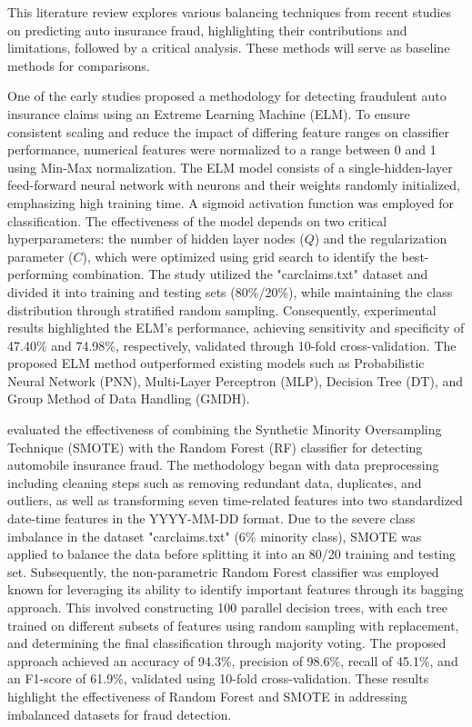 \documentclass[twoside,11pt]{article}
\begin{document}
\begin{keywords}
This literature review explores various balancing techniques from recent studies on predicting auto insurance fraud, highlighting their contributions and limitations, followed by a critical analysis. These methods will serve as baseline methods for comparisons.

One of the early studies \cite{Patel2019} proposed a methodology for detecting fraudulent auto insurance claims using an Extreme Learning Machine (ELM). To ensure consistent scaling and reduce the impact of differing feature ranges on classifier performance, numerical features were normalized to a range between 0 and 1 using Min-Max normalization. The ELM model consists of a single-hidden-layer feed-forward neural network with neurons and their weights randomly initialized, emphasizing high training time. A sigmoid activation function was employed for classification. The effectiveness of the model depends on two critical hyperparameters: the number of hidden layer nodes (\(Q\)) and the regularization parameter (\(C\)), which were optimized using grid search to identify the best-performing combination. The study utilized the "carclaims.txt" dataset and divided it into training and testing sets (80\%/20\%), while maintaining the class distribution through stratified random sampling. Consequently, experimental results highlighted the ELM's performance, achieving sensitivity and specificity of 47.40\% and 74.98\%, respectively, validated through 10-fold cross-validation. The proposed ELM method outperformed existing models such as Probabilistic Neural Network (PNN), Multi-Layer Perceptron (MLP), Decision Tree (DT), and Group Method of Data Handling (GMDH).


\cite{Harjai2019} evaluated the effectiveness of combining the Synthetic Minority Oversampling Technique (SMOTE) with the Random Forest (RF) classifier for detecting automobile insurance fraud. The methodology began with data preprocessing including cleaning steps such as removing redundant data, duplicates, and outliers, as well as transforming seven time-related features into two standardized date-time features in the YYYY-MM-DD format. Due to the severe class imbalance in the dataset "carclaims.txt" (6\% minority class), SMOTE was applied to balance the data before splitting it into an 80/20 training and testing set. Subsequently, the non-parametric Random Forest classifier was employed known for leveraging its ability to identify important features through its bagging approach. This involved constructing 100 parallel decision trees, with each tree trained on different subsets of features using random sampling with replacement, and determining the final classification through majority voting. The proposed approach achieved an accuracy of 94.3\%, precision of 98.6\%, recall of 45.1\%, and an F1-score of 61.9\%, validated using 10-fold cross-validation. These results highlight the effectiveness of Random Forest and SMOTE in addressing imbalanced datasets for fraud detection.


\end{keywords}
\end{document}
